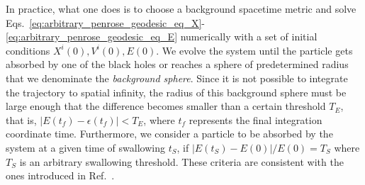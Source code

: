 In practice, what one does is to choose a background spacetime metric and solve Eqs.~\eqref{eq:arbitrary_penrose_geodesic_eq_X}-\eqref{eq:arbitrary_penrose_geodesic_eq_E} numerically with a set of initial conditions $X^i(0), V^i(0), E(0)$. We evolve the system until the particle gets absorbed by one of the black holes or reaches a sphere of predetermined radius that we denominate the \emph{background sphere}. Since it is not possible to integrate the trajectory to spatial infinity, the radius of this background sphere must be large enough that the difference becomes smaller than a certain threshold $T_E$, that is, $|E(t_f)- \epsilon(t_f)| < T_E$, where $t_f$ represents the final integration coordinate time. Furthermore, we consider a particle to be absorbed by the system at a given time of swallowing $t_S$, if $|E(t_S) - E(0)|/E(0) = T_S$ where $T_S$ is an arbitrary swallowing threshold. These criteria are consistent with the ones introduced in Ref.~\cite{Bohn:2014xxa}.

